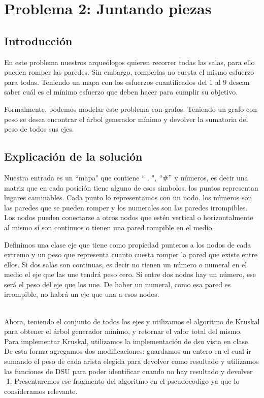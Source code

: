 \documentclass[spanish,12pt]{article}
\begin{document}
\section{Problema 2: Juntando piezas }

\subsection{Introducción}

En este problema nuestros arqueólogos quieren recorrer todas las salas, para ello pueden romper las paredes. Sin embargo, romperlas no cuesta el mismo esfuerzo para todas. Teniendo un mapa con los esfuerzos cuantificados del 1 al 9 desean saber cuál es el mínimo esfuerzo que deben hacer para cumplir su objetivo.

Formalmente, podemos modelar este problema con grafos. Teniendo un grafo con peso se desea encontrar el árbol generador mínimo y devolver la sumatoria del peso de todos sus ejes.

\subsection{Explicación de la solución}

Nuestra entrada es un ``mapa" que contiene `` . ", $``\# "$ y números, es decir una matriz que en cada posición tiene alguno de esos simbolos. los puntos representan lugares caminables. Cada punto lo representamos con un nodo. los números son las paredes que se pueden romper y los numerales son las paredes irrompibles. Los nodos pueden conectarse a otros nodos que estén vertical o horizontalmente al mismo sí son continuos o tienen una pared rompible en el medio.

Definimos una clase eje que tiene como propiedad punteros a los nodos de cada extremo y un peso que representa cuanto cuesta romper la pared que existe entre ellos. Si dos salas son continuas, es decir no tienen un número o numeral en el medio el eje que las une tendrá peso cero. Sí entre dos nodos hay un número, ese será el peso del eje que los une. De haber un numeral, como esa pared es irrompible, no habrá un eje que una a esos nodos.

\\
Ahora, teniendo el conjunto de todos los ejes y utilizamos el algoritmo de Kruskal para obtener el árbol generador mínimo, y retornar el valor total del mismo. 
\\
Para implementar Kruskal, utilizamos la implementación de dsu vista en clase. De esta forma agregamos dos modificaciones:
guardamos un entero en el cual ir sumando el peso de cada arista elegida para devolver como resultado y utilizamos las funciones de DSU para poder identificar cuando no hay resultado y devolver -1. Presentaremos ese fragmento del algoritmo en el pseudocodigo ya que lo consideramos relevante.
\end{document}
